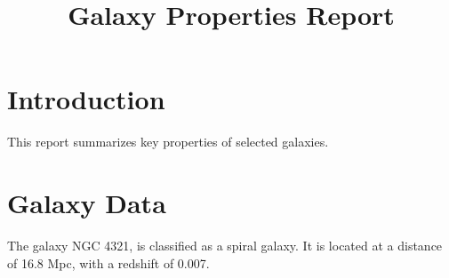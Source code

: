 \documentclass{article}
\title{Galaxy Properties Report}
\author{}
\date{}
\begin{document}
\maketitle

\section{Introduction}
This report summarizes key properties of selected galaxies.

\section{Galaxy Data}
The galaxy NGC 4321, is classified as a spiral galaxy. 
It is located at a distance of 16.8 Mpc, with a redshift of 0.007.
\end{document}
